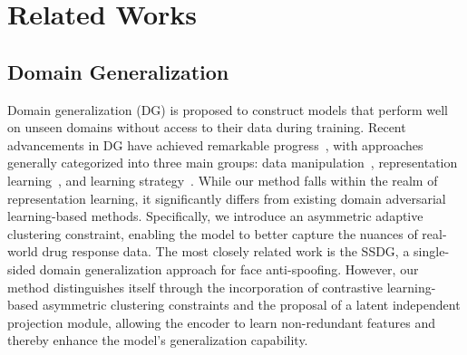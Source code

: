 \section{Related Works}
\subsection{Domain Generalization}
Domain generalization (DG) is proposed to construct models that perform well on unseen domains without access to their data during training. Recent advancements in DG have achieved remarkable progress~\cite{wang2022generalizing}, with approaches generally categorized into three main groups: data manipulation~\cite{shankar2018generalizing,yue2019domain,zhou2021domain}, representation learning~\cite{ghifary2015domain,li2018domain,shao2019multi,sicilia2023domain,zhang2022towards}, and learning strategy~\cite{chen2022discriminative,tian2022neuron,carlucci2019domain}. While our method falls within the realm of representation learning, it significantly differs from existing domain adversarial learning-based methods. Specifically, we introduce an asymmetric adaptive clustering constraint, enabling the model to better capture the nuances of real-world drug response data. The most closely related work is the SSDG\cite{jia2020single}, a single-sided domain generalization approach for face anti-spoofing. However, our method distinguishes itself through the incorporation of contrastive learning-based asymmetric clustering constraints and the proposal of a latent independent projection module, allowing the encoder to learn non-redundant features and thereby enhance the model's generalization capability.


